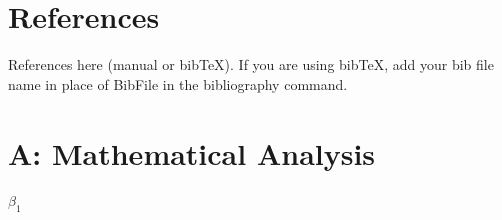 \documentclass[AEJ]{AEA}
\begin{document}
\section{References}



References here (manual or bibTeX). If you are using bibTeX, add your bib file 
name in place of BibFile in the bibliography command.



\appendix

\section{A: Mathematical Analysis}

$\beta_1$
\end{document}
